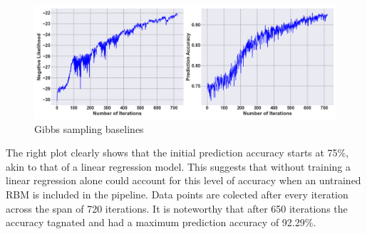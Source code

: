 \begin{figure}[H]
    \centering
    \includegraphics[width=1\linewidth]{graphics/CD_combined_plot.png}
    \caption{Gibbs sampling baselines}
    \label{CD_baselines}
\end{figure}
The right plot clearly shows that the initial prediction accuracy starts at 75\%, akin to that of a linear regression model.
This suggests that without training a linear regression alone could account for this level of accuracy when an untrained \ac{RBM} is included in the pipeline.
Data points are colected after every iteration across the span of 720 iterations. 
It is noteworthy that after 650 iterations the accuracy tagnated and had a maximum prediction accuracy
of 92.29\%. 

